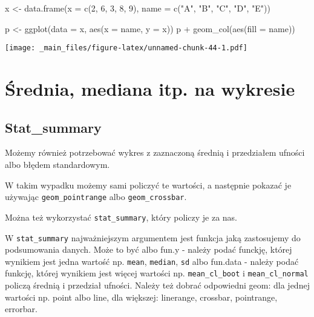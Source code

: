 \documentclass[
]{book}
\newenvironment{Shaded}{\begin{snugshade}}{\end{snugshade}}
\newcommand{\AttributeTok}[1]{\textcolor[rgb]{0.77,0.63,0.00}{#1}}
\newcommand{\DecValTok}[1]{\textcolor[rgb]{0.00,0.00,0.81}{#1}}
\newcommand{\FunctionTok}[1]{\textcolor[rgb]{0.00,0.00,0.00}{#1}}
\newcommand{\NormalTok}[1]{#1}
\newcommand{\OtherTok}[1]{\textcolor[rgb]{0.56,0.35,0.01}{#1}}
\newcommand{\SpecialCharTok}[1]{\textcolor[rgb]{0.00,0.00,0.00}{#1}}
\newcommand{\StringTok}[1]{\textcolor[rgb]{0.31,0.60,0.02}{#1}}
\begin{document}
\begin{Shaded}
\begin{Highlighting}[]
\NormalTok{x }\OtherTok{\textless{}{-}} \FunctionTok{data.frame}\NormalTok{(}\AttributeTok{x =} \FunctionTok{c}\NormalTok{(}\DecValTok{2}\NormalTok{, }\DecValTok{6}\NormalTok{, }\DecValTok{3}\NormalTok{, }\DecValTok{8}\NormalTok{, }\DecValTok{9}\NormalTok{), }\AttributeTok{name =} \FunctionTok{c}\NormalTok{(}\StringTok{"A"}\NormalTok{, }\StringTok{"B"}\NormalTok{, }\StringTok{"C"}\NormalTok{, }\StringTok{"D"}\NormalTok{, }\StringTok{"E"}\NormalTok{))}

\NormalTok{p }\OtherTok{\textless{}{-}} \FunctionTok{ggplot}\NormalTok{(}\AttributeTok{data =}\NormalTok{ x, }\FunctionTok{aes}\NormalTok{(}\AttributeTok{x =}\NormalTok{ name, }\AttributeTok{y =}\NormalTok{ x))}
\NormalTok{p }\SpecialCharTok{+} \FunctionTok{geom\_col}\NormalTok{(}\FunctionTok{aes}\NormalTok{(}\AttributeTok{fill =}\NormalTok{ name))}
\end{Highlighting}
\end{Shaded}

\texttt{[image: \_main\_files/figure-latex/unnamed-chunk-44-1.pdf]}

\hypertarget{ux15brednia-mediana-itp.-na-wykresie}{%
\section{Średnia, mediana itp. na wykresie}\label{ux15brednia-mediana-itp.-na-wykresie}}

\hypertarget{stat_summary}{%
\subsection{Stat\_summary}\label{stat_summary}}

Możemy również potrzebować wykres z zaznaczoną średnią i przedziałem ufności albo błędem standardowym.

W takim wypadku możemy sami policzyć te wartości, a następnie pokazać je używając \texttt{geom\_pointrange} albo \texttt{geom\_crossbar}.

Można też wykorzystać \texttt{stat\_summary}, który policzy je za nas.

W \texttt{stat\_summary} najważniejszym argumentem jest funkcja jaką zastosujemy do podsumowania danych. Może to być albo fun.y - należy podać funckję, której wynikiem jest jedna wartość np. \texttt{mean}, \texttt{median}, \texttt{sd} albo fun.data - należy podać funkcję, której wynikiem jest więcej wartości np. \texttt{mean\_cl\_boot} i \texttt{mean\_cl\_normal} policzą średnią i przedział ufności. Należy też dobrać odpowiedni geom: dla jednej wartości np. point albo line, dla większej: linerange, crossbar, pointrange, errorbar.
\end{document}
